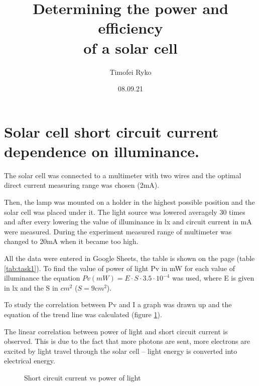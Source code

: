 \documentclass[12pt, letterpaper]{article}
\title{Determining the power and efficiency\protect\\ of a solar cell}
\author{Timofei Ryko}
\date{08.09.21}
\begin{document}
\maketitle
\section{Solar cell short circuit current dependence on illuminance.}
The solar cell was connected to a multimeter with two wires and the optimal direct current measuring range was chosen (2mA).
\par
Then, the lamp was mounted on a holder in the highest possible position and the solar cell was placed under it. The light source was lowered averagely 30 times and after every lowering the value of illuminance in lx and circuit current in mA were measured. During the experiment measured range of multimeter was changed to 20mA when it became too high.
\par
All the data were entered in Google Sheets, the table is shown on the page \pageref{tab:task1} (table \ref{tab:task1}). To find the value of power of light Pv in mW for each value of illuminance the equation $Pv (mW) = E \cdot S \cdot 3.5 \cdot 10^{-4}$ was used, where E is given in lx and the S in $cm^2$ ($S = 9cm^2$).
\par
To study the correlation between Pv and I a graph was drawn up and the equation of the trend line was calculated (figure \ref{fig:task1}).
\par
The linear correlation between power of light and short circuit current is observed. This is due to the fact that more photons are sent, more electrons are excited by light travel through the solar cell -- light energy is converted into electrical energy.

\begin{table}
\centering
{}
\caption{Data measured for task 1}
\label{tab:task1}
\end{table}

\begin{figure}
\centering
{}
\caption{Short circuit current vs power of light}
\label{fig:task1}
\end{figure}
\end{document}
